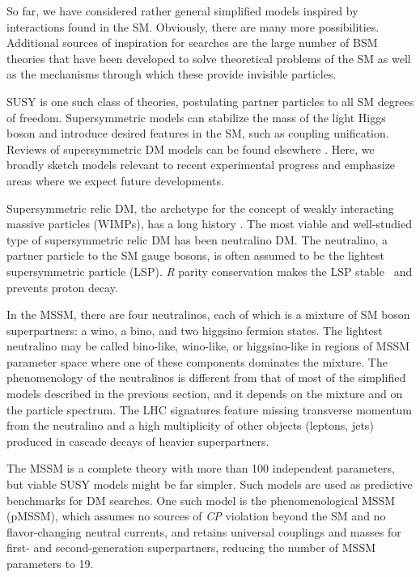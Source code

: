 \documentclass{ar-1col}
\newcommand{\IP}{invisible particle}
\begin{document}
So far, we have considered rather general simplified models
inspired by interactions found in the SM. 
Obviously, there are many more possibilities. Additional sources of inspiration for
searches are the large number of BSM theories that have been
developed to solve theoretical problems of the SM as well as the
mechanisms through which these provide {\IP}s.


SUSY is one such class of theories, postulating
partner particles to all SM degrees of freedom. Supersymmetric models 
can stabilize the mass of the light Higgs boson and introduce desired features
in the SM, such as coupling unification. 
Reviews of supersymmetric DM models
can be found elsewhere \cite{Feng:2010gw}. Here, we broadly
sketch models relevant to recent experimental progress and emphasize areas
where we expect future developments.

Supersymmetric relic DM, the archetype for the concept of weakly interacting massive particles (WIMPs),
has a long history \cite{1984NuPhB.238..453E}. The most
viable and well-studied type of supersymmetric relic DM has been neutralino DM. The
neutralino, a partner particle to the SM gauge bosons, is
often assumed to be the lightest supersymmetric particle (LSP).
\textit{R} parity conservation makes the LSP stable~\cite{Farrar:1978xj}
and prevents proton decay.

In the MSSM, there are four neutralinos, each of which is a mixture of SM boson
superpartners: a wino, a bino, and two higgsino fermion states.
The lightest neutralino may be called bino-like, wino-like, or
higgsino-like in regions of MSSM parameter space where one of
these components dominates the mixture. 
The phenomenology of the neutralinos is different from that of most of the simplified models described in the previous
section, and it depends on the mixture and on the particle spectrum.
The LHC signatures feature missing transverse momentum from the
neutralino and a high multiplicity of other objects (leptons,
jets) produced in cascade decays of heavier superpartners.

The MSSM is a complete theory with more than 100 independent
parameters, but viable SUSY models might be far simpler. Such
models are used as predictive benchmarks for DM searches. One such model is the phenomenological MSSM (pMSSM), which assumes no
sources of \textit{CP} violation beyond the SM and no flavor-changing neutral
currents, and retains universal couplings and masses for first- and
second-generation superpartners, reducing the number of MSSM
parameters to 19. 
\end{document}
